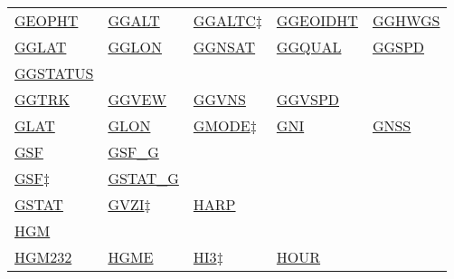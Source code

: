 \documentclass[
  english,
]{book}
\begin{document}
\begin{longtable}[]{@{}lllll@{}}
\href{/rmd_output/1/3-the-state-of-the-aircraft.html\#geopth}{GEOPHT} & \href{/rmd_output/1/3-the-state-of-the-aircraft.html\#ggalt}{GGALT} & \href{/rmd_output/1/3-the-state-of-the-aircraft.html\#altx}{GGALTC\(\ddagger\)} & \href{/rmd_output/1/3-the-state-of-the-aircraft.html\#ggeoidht}{GGEOIDHT} & \href{/rmd_output/1/3-the-state-of-the-aircraft.html\#gghwgs}{GGHWGS} \\
\href{/rmd_output/1/3-the-state-of-the-aircraft.html\#gglat}{GGLAT} & \href{/rmd_output/1/3-the-state-of-the-aircraft.html\#gglon}{GGLON} & \href{/rmd_output/1/3-the-state-of-the-aircraft.html\#ggnsat}{GGNSAT} & \href{/rmd_output/1/3-the-state-of-the-aircraft.html\#ggqual}{GGQUAL} & \href{/rmd_output/1/3-the-state-of-the-aircraft.html\#ggspd}{GGSPD} \\
\href{/rmd_output/1/3-the-state-of-the-aircraft.html\#ggstatus}{GGSTATUS} & & & & \\
\href{/rmd_output/1/3-the-state-of-the-aircraft.html\#ggtrk}{GGTRK} & \href{/rmd_output/1/3-the-state-of-the-aircraft.html\#ggvew}{GGVEW} & \href{/rmd_output/1/3-the-state-of-the-aircraft.html\#ggvns}{GGVNS} & \href{/rmd_output/1/3-the-state-of-the-aircraft.html\#ggvspd}{GGVSPD} & \\
\href{/rmd_output/1/3-the-state-of-the-aircraft.html\#gglat}{GLAT} & \href{/rmd_output/1/3-the-state-of-the-aircraft.html\#gglon}{GLON} & \href{/rmd_output/1/3-the-state-of-the-aircraft.html\#gmode}{GMODE\(\ddagger\)} & \href{/rmd_output/1/7-aerosol-particle-measurements.html\#special-aerosol}{GNI} & \href{/rmd_output/1/4-the-state-of-the-atmosphere.html\#special-use-remote}{GNSS} \\
\href{/rmd_output/1/3-the-state-of-the-aircraft.html\#gsf}{GSF} & \href{/rmd_output/1/3-the-state-of-the-aircraft.html\#ggspd}{GSF\_G} & & & \\
\href{/rmd_output/1/10-obsolete-variables.html\#gsf-obsolete}{GSF\(\ddagger\)} & \href{/rmd_output/1/3-the-state-of-the-aircraft.html\#ggstatus}{GSTAT\_G} & & & \\
\href{/rmd_output/1/3-the-state-of-the-aircraft.html\#ggstatus}{GSTAT} & \href{/rmd_output/1/3-the-state-of-the-aircraft.html\#ggvspd}{GVZI\(\ddagger\)} & \href{/rmd_output/1/8-radiation-variables.html\#harp}{HARP} & & \\
\href{/rmd_output/1/3-the-state-of-the-aircraft.html\#hgm}{HGM} & & & & \\
\href{/rmd_output/1/3-the-state-of-the-aircraft.html\#hgm-232}{HGM232} & \href{/rmd_output/1/3-the-state-of-the-aircraft.html\#hgme-159}{HGME} & \href{/rmd_output/1/3-the-state-of-the-aircraft.html\#hi3}{HI3\(\ddagger\)} & \href{/rmd_output/1/2-general-information-about-data-files.html\#hms}{HOUR} & \\

\end{longtable}
\end{document}
